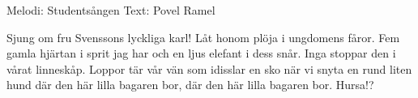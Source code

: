 \begin{song}

\begin{songmeta}
Melodi: Studentsången
Text: Povel Ramel
\end{songmeta}

\begin{songtext}
Sjung om fru Svenssons lyckliga karl!
Låt honom plöja i ungdomens fåror.
Fem gamla hjärtan i sprit jag har
och en ljus elefant i dess snår.
Inga stoppar den
i vårat linneskåp.
Loppor tär vår vän
som idisslar en sko
när vi snyta en rund liten hund
där den här lilla bagaren bor,
där den här lilla bagaren bor.
Hursa!?

\end{songtext}
\end{song}
